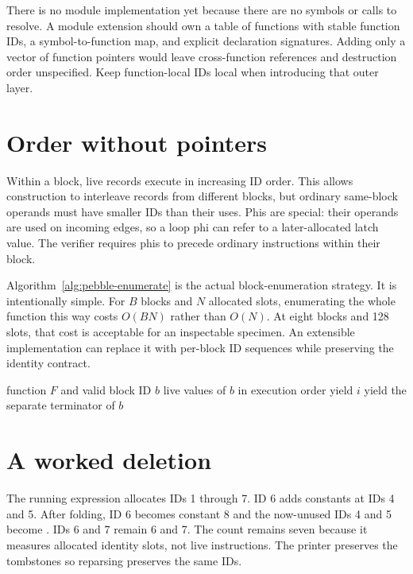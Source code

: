 There is no module implementation yet because there are no symbols or calls to resolve.
A module extension should own a table of functions with stable function IDs, a symbol-to-function map, and explicit declaration signatures.
Adding only a vector of function pointers would leave cross-function references and destruction order unspecified.
Keep function-local IDs local when introducing that outer layer.

\section{Order without pointers}
\label{sec:pebble-order}
Within a block, live records execute in increasing ID order.
This allows construction to interleave records from different blocks, but ordinary same-block operands must have smaller IDs than their uses.
Phis are special: their operands are used on incoming edges, so a loop phi can refer to a later-allocated latch value.
The verifier requires phis to precede ordinary instructions within their block.

Algorithm~\ref{alg:pebble-enumerate} is the actual block-enumeration strategy.
It is intentionally simple.
For $B$ blocks and $N$ allocated slots, enumerating the whole function this way costs $O(BN)$ rather than $O(N)$.
At eight blocks and 128 slots, that cost is acceptable for an inspectable specimen.
An extensible implementation can replace it with per-block ID sequences while preserving the identity contract.

\begin{algorithm}[htbp]
\caption{Enumerating one block without moving value records.}
\label{alg:pebble-enumerate}
\begin{pseudocode}
\Require function $F$ and valid block ID $b$
\Ensure live values of $b$ in execution order
\State yield $i$
\EndIf
\EndFor
\State yield the separate terminator of $b$
\end{pseudocode}
\end{algorithm}

\section{A worked deletion}
\label{sec:pebble-tombstone}
The running expression allocates IDs 1 through 7.
ID 6 adds constants at IDs 4 and 5.
After folding, ID 6 becomes constant 8 and the now-unused IDs 4 and 5 become .
IDs 6 and 7 remain 6 and 7.
The count remains seven because it measures allocated identity slots, not live instructions.
The printer preserves the tombstones so reparsing preserves the same IDs.


